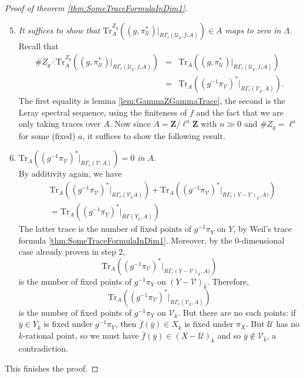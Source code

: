 \begin{proof}[Proof of theorem \ref{thm:SomeTraceFormulaInDim1}]
\begin{enumerate}
\setcounter{enumi}{4}
\item
{\it
It suffices to show that $\text{Tr}_A^{Z_g}\left((g,
\pi_\mathcal{U}^*)\big|_{R\Gamma_c(\mathcal{U}_{\bar k}, f_*A)}\right) \in A$
maps to zero in $\Lambda$.
}\\
Recall that
\begin{eqnarray*}
\# Z_g \cdot \text{Tr}_A^{Z_g}\left((g,
\pi_\mathcal{U}^*)\big|_{R\Gamma_c(\mathcal{U}_{\bar k}, f_*A)}\right)
& = & \text{Tr}_A\left((g, \pi_\mathcal{U}^*)\big|_{R\Gamma_c(\mathcal{U}_{\bar
k}, f_*A)}\right)\\
& = &
\text{Tr}_A\left((g^{-1}\pi_\mathcal{V})^*\big|_{R\Gamma_c(\mathcal{V}_{\bar
k}, A)}\right).
\end{eqnarray*}
The first equality is lemma \ref{lem:GammaZGammaTrace}, the second is the Leray
spectral sequence, using the finiteness of $f$ and the fact that we are only
taking traces over $A$. Now since $A=\mathbf{Z}/\ell^n\mathbf{Z}$ with $n\gg 0$
and $\# Z_g=\ell^a$ for some (fixed) $a$, it suffices to show the following
result.
\item
{\it $\text{Tr}_A\left((g^{-1}\pi_\mathcal{V})^*\big|_{R\Gamma_c(\mathcal{V},
A)}\right) = 0$ in $A$.} \\
By additivity again, we have
\begin{eqnarray*}
&
\text{Tr}_A
\left(
(g^{-1}\pi_\mathcal{V})^*\big|_{R\Gamma_c(\mathcal{V}_{\bar k} A)}
\right)
+
\text{Tr}_A
\left(
(g^{-1}\pi_\mathcal{V})^*\big|_{R\Gamma_c(Y-\mathcal {V})_{\bar k}, A)}
\right) \\
&
=
\text{Tr}_A
\left(
(g^{-1}\pi_Y)^*\big|_{R\Gamma(Y_{\bar k}, A)}
\right)
\end{eqnarray*}
The latter trace is the number of fixed points of $g^{-1}\pi_Y$ on $Y$, by
Weil's trace formula \ref{thm:SomeTraceFormulaInDim1}. Moreover, by the
0-dimensional case already proven in step 2,
$$
\text{Tr}_A\left((g^{-1}\pi_\mathcal{V})^*\big|_{R\Gamma_c(Y-\mathcal{V})_{\bar
k}, A)}\right)
$$
is the number of fixed points of $g^{-1}\pi_Y$ on $(Y-\mathcal{V})_{\bar k}$.
Therefore,
$$
\text{Tr}_A\left((g^{-1}\pi_\mathcal{V})^*\big|_{R\Gamma_c(\mathcal{V}_{\bar
k}, A)}\right)
$$
is the number of fixed points of $g^{-1}\pi_Y$ on $\mathcal{V}_{\bar k}$. But
there are no such points: if $\bar y\in Y_{\bar k}$ is fixed under
$g^{-1}\pi_Y$, then $\bar f(\bar y) \in X_{\bar k}$ is fixed under $\pi_X$. But
$\mathcal{U}$ has no $k$-rational point, so we must have $\bar f(\bar y)\in
(X-\mathcal{U})_{\bar k}$ and so $\bar y\notin \mathcal{V}_{\bar k}$, a
contradiction.
\end{enumerate}
This finishes the proof.
\end{proof}

